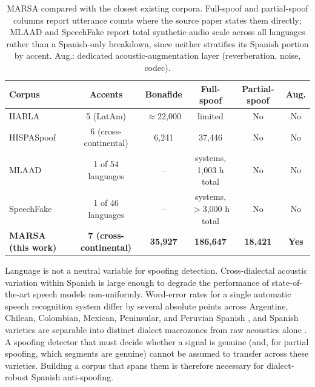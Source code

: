 \documentclass[11pt]{article}
\begin{document}
\begin{table}[t]
\centering
\caption{MARSA compared with the closest existing corpora. Full-spoof
and partial-spoof columns report utterance counts where the source
paper states them directly; MLAAD and SpeechFake report total
synthetic-audio scale across all languages rather than a Spanish-only
breakdown, since neither stratifies its Spanish portion by accent.
Aug.: dedicated acoustic-augmentation layer (reverberation, noise,
codec).}
\label{tab:corpuscompare}
\small
\begin{tabular}{lccccc}
\toprule
\textbf{Corpus} & \textbf{Accents} & \textbf{Bonafide} & \textbf{Full-spoof} & \textbf{Partial-spoof} & \textbf{Aug.} \\
\midrule
HABLA \citep{habla}      & 5 (LatAm)         & $\approx$22{,}000 & limited     & No & No \\
HISPASpoof \citep{hispaspoof} & 6 (cross-continental) & 6{,}241 & 37{,}446 & No & No \\
MLAAD \citep{mlaad}      & 1 of 54 languages & --      & \multicolumn{1}{c}{\parbox{2.1cm}{ systems,\\1{,}003 h total}} & No & No \\
SpeechFake \citep{speechfake} & 1 of 46 languages & -- & \multicolumn{1}{c}{\parbox{2.1cm}{ systems,\\$>$3{,}000 h total}} & No & No \\
\textbf{MARSA (this work)} & \textbf{7 (cross-continental)} & \textbf{35{,}927} & \textbf{186{,}647} & \textbf{18{,}421} & \textbf{Yes} \\
\bottomrule
\end{tabular}
\end{table}

Language is not a neutral variable for spoofing detection. Cross-dialectal acoustic variation within Spanish is large enough to degrade the performance of state-of-the-art speech models non-uniformly. Word-error rates for a single automatic speech recognition system differ by several absolute points across Argentine, Chilean, Colombian, Mexican, Peninsular, and Peruvian Spanish \citep{kantharuban2023dialectgap,nacimiento2024biases}, and Spanish varieties are separable into distinct dialect macrozones from raw acoustics alone \citep{zuluaga2023commonaccent}. A spoofing detector that must decide whether a signal is genuine (and, for partial spoofing, which segments are genuine) cannot be assumed to transfer across these varieties. Building a corpus that spans them is therefore necessary for dialect-robust Spanish anti-spoofing.
\end{document}

